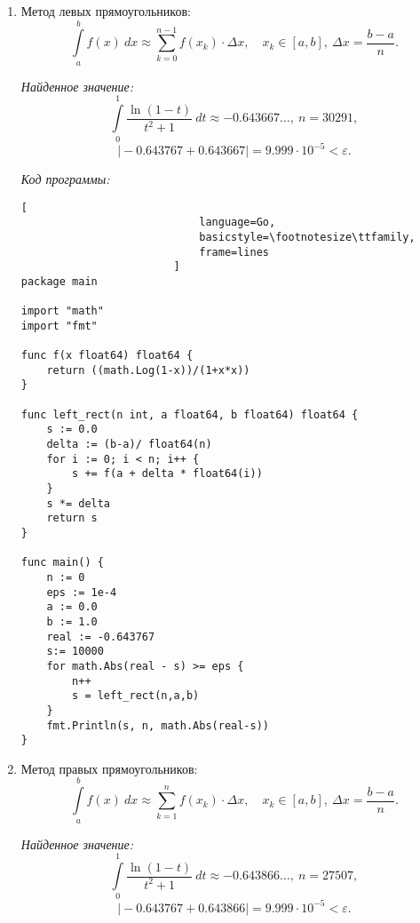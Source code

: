 \documentclass[14pt, a4paper, titlepage, fleqn]{extarticle}
\begin{document}
            \begin{enumerate}
                \item Метод левых прямоугольников:
                    \[
                        \int\limits_a^b f(x) ~ dx \approx
                        \sum_{k=0}^{n-1} f\left( x_k \right) \cdot \Delta x,
                        \quad x_k \in [a, b], ~ \Delta x = \frac{b-a}{n}. 
                    \]

                    \textit{Найденное значение:}
                        \[
                            \int\limits_0^1 \frac{\ln(1-t)}{t^2+1} ~ dt \approx
                            -0.643667\dots, ~ n = 30291,
                        \]
                        \[
                            \vert-0.643767+0.643667\vert = 9.999 
                            \cdot 10^{-5} < \varepsilon.
                        \]

                    \pagebreak

                    \textit{Код программы:}
                        \begin{lstlisting}[
                            language=Go,
                            basicstyle=\footnotesize\ttfamily,
                            frame=lines
                        ]
package main

import "math"
import "fmt"

func f(x float64) float64 {
    return ((math.Log(1-x))/(1+x*x))
}

func left_rect(n int, a float64, b float64) float64 {
    s := 0.0
    delta := (b-a)/ float64(n)
    for i := 0; i < n; i++ {
        s += f(a + delta * float64(i))
    }
    s *= delta
    return s
}

func main() {
    n := 0
    eps := 1e-4
    a := 0.0
    b := 1.0
    real := -0.643767
    s:= 10000
    for math.Abs(real - s) >= eps {
        n++
        s = left_rect(n,a,b)
    }
    fmt.Println(s, n, math.Abs(real-s))
}
                        \end{lstlisting}

                \pagebreak

                \item Метод правых прямоугольников:
                    \[
                        \int\limits_a^b f(x) ~ dx \approx
                        \sum_{k=1}^{n} f\left( x_k \right) \cdot \Delta x,
                        \quad x_k \in [a, b], ~ \Delta x = \frac{b-a}{n}.  
                    \]


                    \textit{Найденное значение:}
                        \[
                            \int\limits_0^1 \frac{\ln(1-t)}{t^2+1} ~ dt \approx
                            -0.643866\dots, ~ n = 27507,
                        \]
                        \[
                            \vert-0.643767+0.643866\vert = 9.999 
                            \cdot 10^{-5} < \varepsilon.
                        \]


\end{enumerate}
\end{document}
